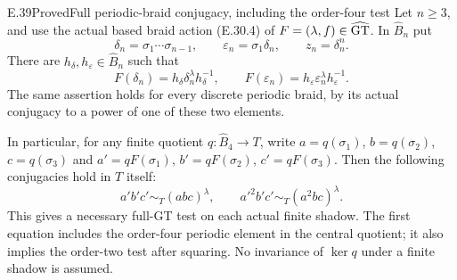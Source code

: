\begin{statement}{E.39}{Proved}{Full periodic-braid conjugacy, including the order-four test}
Let $n\ge3$, and use the actual based braid action
\textup{(E.30.4)} of $F=(\lambda,f)\in\widehat{\rm GT}$.
In $\widehat B_n$ put
\[
 \delta_n=\sigma_1\cdots\sigma_{n-1},\qquad
 \varepsilon_n=\sigma_1\delta_n,\qquad z_n=\delta_n^n.
 \tag{E.39.1}
\]
There are $h_\delta,h_\varepsilon\in\widehat B_n$ such that
\[
 F(\delta_n)=h_\delta\delta_n^\lambda h_\delta^{-1},
 \qquad
 F(\varepsilon_n)=h_\varepsilon\varepsilon_n^\lambda
                                  h_\varepsilon^{-1}.
 \tag{E.39.2}
\]
The same assertion holds for every discrete periodic braid,
by its actual conjugacy to a power of one of these two elements.

In particular, for any finite quotient $q:\widehat B_4\to T$,
write $a=q(\sigma_1)$, $b=q(\sigma_2)$, $c=q(\sigma_3)$
and $a'=qF(\sigma_1)$, $b'=qF(\sigma_2)$, $c'=qF(\sigma_3)$.
Then the following conjugacies hold in $T$ itself:
\[
 a'b'c'\sim_T(abc)^\lambda,
 \qquad a'^2b'c'\sim_T(a^2bc)^\lambda.
 \tag{E.39.3}
\]
This gives a necessary full-GT test on each actual finite
shadow.  The first equation includes the order-four
periodic element in the central quotient; it also implies
the order-two test after squaring.  No invariance of
$\ker q$ under a finite shadow is assumed.
\end{statement}
